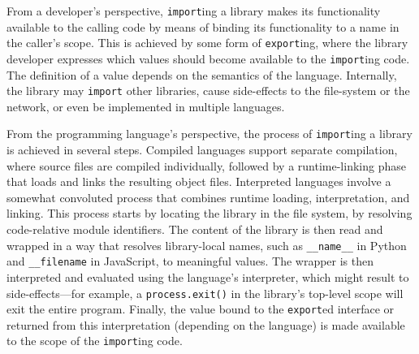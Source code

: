\documentclass[letterpaper,twocolumn,10pt]{article}
\newcommand{\ttt}[1]{\texttt{#1}}
\newcommand{\fixme}[1]{{\color{red}#1}}
\begin{document}
From a developer's perspective, \ttt{import}ing a library makes its functionality available to the calling code by means of binding its functionality to a name in the caller's scope.
This is achieved by some form of \ttt{export}ing, where the library developer expresses which values should become available to the \ttt{import}ing code.
The definition of a value depends on the semantics of the language. %
Internally, the library may \ttt{import} other libraries, cause side-effects to the file-system or the network, or even be implemented in multiple languages.

From the programming language's perspective, the process of \ttt{import}ing a library is achieved in several steps. 
Compiled languages support separate compilation, where source files are compiled individually, followed by a runtime-linking phase that loads and links the resulting object files.
Interpreted languages involve a somewhat convoluted process that combines runtime loading, interpretation, and linking.
This process starts by locating the library in the file system, %
by resolving code-relative module identifiers.
The content of the library is then read and wrapped in a way that resolves library-local names, such as \ttt{\_\_name\_\_} in Python and \ttt{\_\_filename} in JavaScript, to meaningful values.
The wrapper is then interpreted and evaluated using the language's interpreter, which might result to side-effects---for example, a \ttt{process.exit()} in the library's top-level scope will exit the entire program.
Finally, the value bound to the \ttt{export}ed interface or returned from this interpretation (depending on the language) is made available to the scope of the  \ttt{import}ing code.
\end{document}
